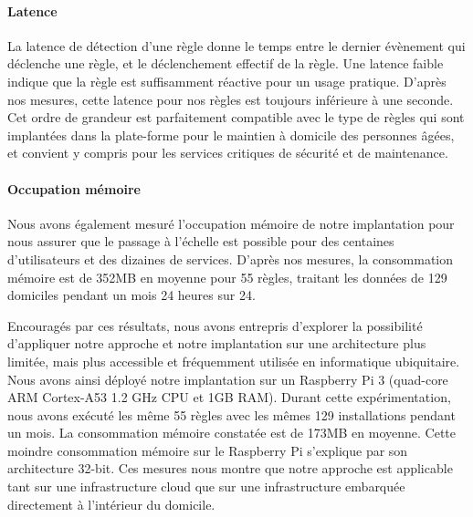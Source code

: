 \paragraph{Latence}
La latence de détection d'une règle donne le temps entre le dernier
évènement qui déclenche une règle, et le déclenchement effectif de la
règle. Une latence faible indique que la règle est suffisamment
réactive pour un usage pratique.  D'après nos mesures, cette latence
pour nos règles est toujours inférieure à une seconde. Cet ordre de
grandeur est parfaitement compatible avec le type de règles qui sont
implantées dans la plate-forme pour le maintien à domicile des
personnes âgées, et convient y compris pour les services critiques de
sécurité et de maintenance.

\paragraph{Occupation mémoire}
Nous avons également mesuré l'occupation mémoire de notre implantation
pour nous assurer que le passage à l'échelle est possible pour des
centaines d'utilisateurs et des dizaines de services. D'après nos
mesures, la consommation mémoire est de 352MB en moyenne pour 55
règles, traitant les données de 129 domiciles pendant un mois 24
heures sur 24.

Encouragés par ces résultats, nous avons entrepris d'explorer la
possibilité d'appliquer notre approche et notre implantation sur une
architecture plus limitée, mais plus accessible et fréquemment
utilisée en informatique ubiquitaire.  Nous avons ainsi déployé notre
implantation sur un Raspberry Pi 3 (quad-core ARM Cortex-A53 1.2 GHz
CPU et 1GB RAM). Durant cette expérimentation, nous avons exécuté les
même 55 règles avec les mêmes 129 installations pendant un mois. La
consommation mémoire constatée est de 173MB en moyenne.  Cette moindre
consommation mémoire sur le Raspberry Pi s'explique par son
architecture 32-bit.  Ces mesures nous montre que notre approche est
applicable tant sur une infrastructure cloud que sur une
infrastructure embarquée directement à l'intérieur du domicile.

